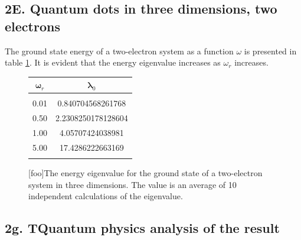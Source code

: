 \documentclass[%
reprint,
amsmath,amssymb,
aps,
]{revtex4-1}
\begin{document}
\subsection*{2E. Quantum dots in three dimensions, two electrons} \noindent 
The ground state energy of a two-electron system as a function $\omega$ is presented in table \ref{tab2}. It is evident that the energy eigenvalue increases as $\omega_r$ increases. 

\begin{figure}[!h]
	\begin{tabular} {|c|c|}
		\hline
		$\mathbf{\omega}_r$ & $\mathbf{\lambda}_0$\\ 
		\hline
		& \\ 
0.01 &  0.840704568261768 \\
0.50 &  2.2308250178128604 \\
1.00 &  4.05707424038981 \\
5.00 &  17.4286222663169 \\ &\\
\hline 
	\end{tabular}
	[foo]{The energy eigenvalue for the ground state of a two-electron system in three dimensions. The value is an average of 10 independent calculations of the eigenvalue.\label{tab2}}
\end{figure}

\subsection*{2g. TQuantum physics analysis of the result} 


\begin{figure}
	\centering
\end{figure}
\end{document}
